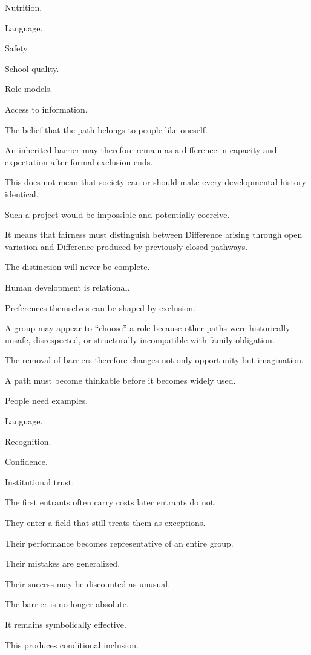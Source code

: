 Nutrition.

Language.

Safety.

School quality.

Role models.

Access to information.

The belief that the path belongs to people like oneself.

An inherited barrier may therefore remain as a difference in capacity and expectation after formal exclusion ends.

This does not mean that society can or should make every developmental history identical.

Such a project would be impossible and potentially coercive.

It means that fairness must distinguish between Difference arising through open variation and Difference produced by previously closed pathways.

The distinction will never be complete.

Human development is relational.

Preferences themselves can be shaped by exclusion.

A group may appear to “choose” a role because other paths were historically unsafe, disrespected, or structurally incompatible with family obligation.

The removal of barriers therefore changes not only opportunity but imagination.

A path must become thinkable before it becomes widely used.

People need examples.

Language.

Recognition.

Confidence.

Institutional trust.

The first entrants often carry costs later entrants do not.

They enter a field that still treats them as exceptions.

Their performance becomes representative of an entire group.

Their mistakes are generalized.

Their success may be discounted as unusual.

The barrier is no longer absolute.

It remains symbolically effective.

This produces conditional inclusion.

